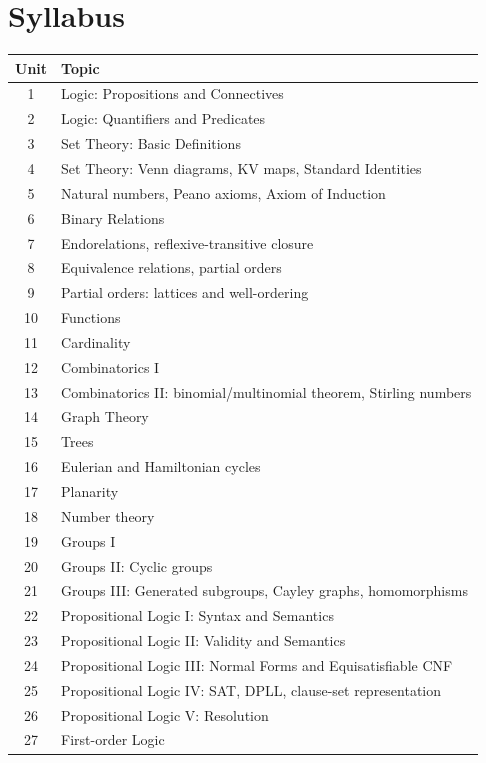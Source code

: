 \documentclass[11pt,a4paper]{article}
\begin{document}
\section{Syllabus}
\begin{tabularx}{\textwidth}{c X}
\toprule
\textbf{Unit} & \textbf{Topic} \\
\midrule
1  & Logic: Propositions and Connectives \\
2  & Logic: Quantifiers and Predicates \\
3  & Set Theory: Basic Definitions \\
4  & Set Theory: Venn diagrams, KV maps, Standard Identities \\
5  & Natural numbers, Peano axioms, Axiom of Induction \\
6  & Binary Relations \\
7  & Endorelations, reflexive-transitive closure \\
8  & Equivalence relations, partial orders \\
9  & Partial orders: lattices and well-ordering \\
10 & Functions \\
11 & Cardinality \\
12 & Combinatorics I \\
13 & Combinatorics II: binomial/multinomial theorem, Stirling numbers \\
14 & Graph Theory \\
15 & Trees \\
16 & Eulerian and Hamiltonian cycles \\
17 & Planarity \\
18 & Number theory \\
19 & Groups I \\
20 & Groups II: Cyclic groups \\
21 & Groups III: Generated subgroups, Cayley graphs, homomorphisms \\
22 & Propositional Logic I: Syntax and Semantics \\
23 & Propositional Logic II: Validity and Semantics \\
24 & Propositional Logic III: Normal Forms and Equisatisfiable CNF \\
25 & Propositional Logic IV: SAT, DPLL, clause-set representation \\
26 & Propositional Logic V: Resolution \\
27 & First-order Logic \\
\bottomrule
\end{tabularx}
\end{document}
